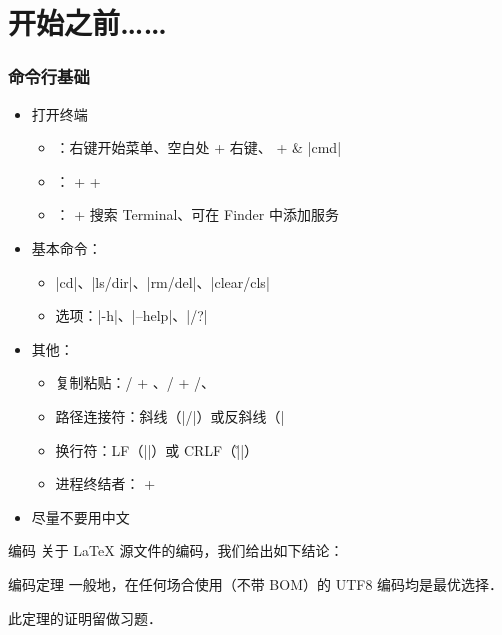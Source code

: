 \section{开始之前……}

\begin{frame}[fragile]
\frametitle{命令行基础}
\begin{itemize}
  \item 打开终端

    \begin{itemize}
      \item \faWindows{}：右键开始菜单、空白处  + 右键、 +  \& |cmd|
      \item \faLinux{}： +  + 
      \item \faApple{}： +  搜索 Terminal、可在 Finder 中添加服务
    \end{itemize}

  \item 基本命令：

    \begin{itemize}
      \item |cd|、|ls/dir|、|rm/del|、|clear/cls|
      \item 选项：|-h|、|--help|、|/?|
    \end{itemize}

  \item 其他：

    \begin{itemize}
      \item 复制粘贴：/ + 、/ + /、
      \item 路径连接符：斜线（|/|）或反斜线（|\|）
      \item 换行符：LF（|\n|）或 CRLF（|\r\n|）
      \item 进程终结者： + 
    \end{itemize} \pause

  \item \alert{尽量不要用中文}
\end{itemize}
\end{frame}

\begin{frame}{编码}
关于 \LaTeX{} 源文件的编码，我们给出如下结论：\pause
\begin{alertblock}{编码定理}
  一般地，在任何场合使用（不带 BOM）的 \alert{UTF\CASE{-}8} 编码均是最优选择．
\end{alertblock} \pause
此定理的证明留做习题．
\end{frame}

